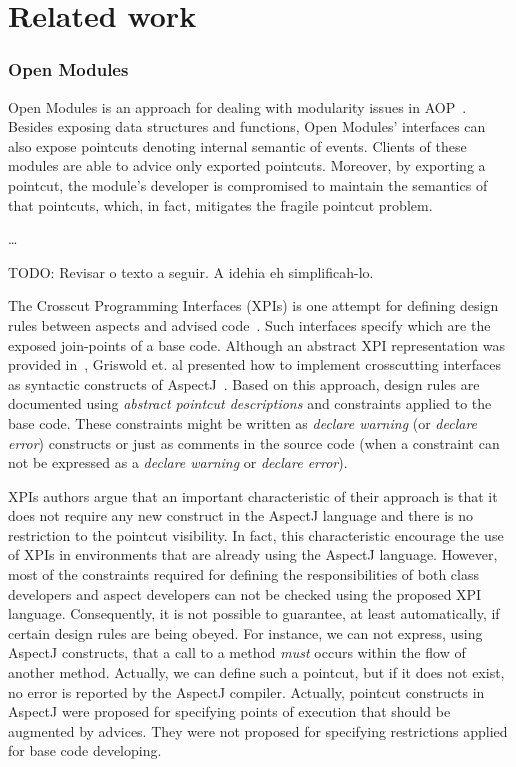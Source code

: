 \section{Related work}


\subsubsection{Open Modules}

Open Modules is an approach for dealing with modularity issues in 
AOP~\cite{aldrich-ecoop-05}. Besides exposing data structures and 
functions, Open Modules' interfaces can also expose pointcuts denoting 
internal semantic of events. Clients of these modules are able to advice 
only exported pointcuts. Moreover, by exporting a pointcut, the module's 
developer is compromised to maintain the semantics of that pointcuts, 
which, in fact, mitigates the fragile pointcut problem. 

\ldots

TODO: Revisar o texto a seguir. A idehia eh simplificah-lo.

The Crosscut Programming Interfaces (XPIs) is one attempt for defining design rules between aspects and 
advised code~\cite{sullivan-sigsoft-2005,sullivan-ieee-sw-2006}. Such interfaces specify which are the exposed 
join-points of a base code. Although an abstract XPI representation was provided in~\cite{sullivan-sigsoft-2005}, Griswold et. al  
presented how to implement crosscutting interfaces as syntactic constructs of AspectJ~\citet{sullivan-ieee-sw-2006}. 
Based on this approach, design rules are documented using \emph{abstract pointcut descriptions} and constraints 
applied to the base code. These constraints might be written as \emph{declare warning} (or \emph{declare error}) constructs
or just as comments in the source code (when a constraint can not be expressed as a \emph{declare warning} 
or \emph{declare error}). 

XPIs authors argue that an important characteristic of their approach is that it
does not require any new construct in the AspectJ language and there is no
restriction to the pointcut visibility. In fact, this characteristic encourage
the use of XPIs in environments that are already using the AspectJ language.
However, most of the constraints required for defining the responsibilities of
both class developers and aspect developers can not be checked using the proposed
XPI language. Consequently, it is not possible to guarantee, at least
automatically, if certain design rules are being obeyed. For instance, we can not
express, using AspectJ constructs, that a call to a method \emph{must} occurs
within the flow of another method. Actually, we can define such a pointcut, but
if it does not exist,  no error is reported by the AspectJ compiler. Actually,
pointcut constructs in AspectJ were proposed for specifying points of execution
that should be augmented by advices. They were not proposed for specifying
restrictions applied for base code developing.



